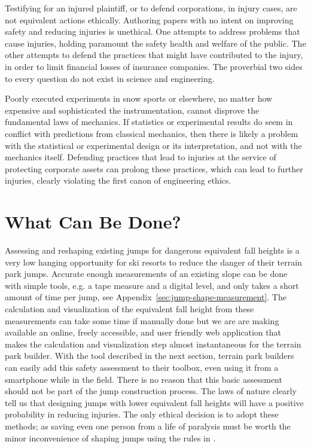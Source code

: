 \documentclass{article}
\begin{document}
Testifying for an injured plaintiff, or to defend corporations, in injury
cases, are not equivalent actions ethically. Authoring papers with
no intent on improving safety and reducing injuries is unethical. One attempts to
address problems that cause injuries, holding paramount the safety health
and welfare of the public. The other attempts to defend the practices that
might have contributed to the injury, in order to limit financial losses of insurance
companies. The proverbial two sides to every question do not exist in science and
engineering.

Poorly executed experiments in snow sports or elsewhere, no matter how expensive and
sophisticated the instrumentation, cannot disprove the fundamental
laws of  mechanics. If statistics or experimental results do seem in
conflict with predictions from classical mechanics, then there is likely a problem
with the statistical or experimental design or its interpretation, and not
with the mechanics itself. Defending practices that lead to injuries at the
service of protecting corporate assets can prolong these practices, which can lead to further
injuries, clearly violating the first canon of engineering ethics.



\section{What Can Be Done?}
%
Assessing and reshaping existing jumps for dangerous equivalent fall heights is
a very low hanging opportunity for ski resorts to reduce the danger of their
terrain park jumps. Accurate enough measurements of an existing slope can be
done with simple tools, e.g. a tape measure and a digital level, and only takes
a short amount of time per jump, see Appendix~\ref{sec:jump-shape-measurement}.
The calculation and visualization of the equivalent fall height from these
measurements can take some time if manually done but we are are making
available an online, freely accessible, and user friendly web application that
makes the calculation and visualization step almost instantaneous for the
terrain park builder. With the tool described in the next section, terrain park
builders can easily add this safety assessment to their toolbox, even using it
from a smartphone while in the field. There is no reason that this basic
assessment should not be part of the jump construction process. The laws of
nature clearly tell us that designing jumps with lower equivalent fall heights
will have a positive probability in reducing injuries.  The only ethical
decision is to adopt these methods; as saving even one person from a life of
paralysis must be worth the minor inconvenience of shaping jumps using the
rules in \cite{Levy2015}.
\end{document}
